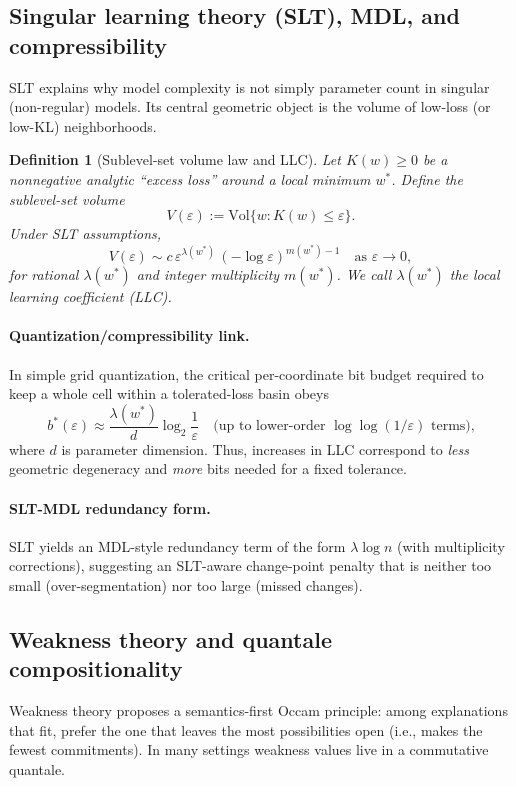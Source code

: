 \documentclass[11pt]{article}
\newcommand{\Vol}{\mathrm{Vol}}
\newtheorem{definition}{Definition}
\begin{document}
\subsection{Singular learning theory (SLT), MDL, and compressibility}
SLT explains why model complexity is not simply parameter count in singular (non-regular) models.
Its central geometric object is the volume of low-loss (or low-KL) neighborhoods.

\begin{definition}[Sublevel-set volume law and LLC]
Let $K(w) \ge 0$ be a nonnegative analytic ``excess loss'' around a local minimum $w^\ast$.
Define the sublevel-set volume
\[
V(\varepsilon) := \Vol\{ w : K(w) \le \varepsilon\}.
\]
Under SLT assumptions,
\[
V(\varepsilon) \sim c\, \varepsilon^{\lambda(w^\ast)} \, (-\log \varepsilon)^{m(w^\ast)-1}
\quad\text{as } \varepsilon \to 0,
\]
for rational $\lambda(w^\ast)$ and integer multiplicity $m(w^\ast)$.
We call $\lambda(w^\ast)$ the \emph{local learning coefficient (LLC)}.
\end{definition}

\paragraph{Quantization/compressibility link.}
In simple grid quantization, the critical per-coordinate bit budget required to keep a whole cell within
a tolerated-loss basin obeys
\[
b^\ast(\varepsilon) \approx \frac{\lambda(w^\ast)}{d} \log_2\!\frac{1}{\varepsilon}
\quad\text{(up to lower-order } \log\log(1/\varepsilon)\text{ terms),}
\]
where $d$ is parameter dimension. Thus, increases in LLC correspond to \emph{less} geometric degeneracy and
\emph{more} bits needed for a fixed tolerance.

\paragraph{SLT-MDL redundancy form.}
SLT yields an MDL-style redundancy term of the form $\lambda \log n$ (with multiplicity corrections),
suggesting an SLT-aware change-point penalty that is neither too small (over-segmentation) nor too large
(missed changes).

\subsection{Weakness theory and quantale compositionality}\label{sec:weakness}
Weakness theory proposes a semantics-first Occam principle: among explanations that fit,
prefer the one that leaves the most possibilities open (i.e., makes the fewest commitments).
In many settings weakness values live in a commutative quantale.
\end{document}
